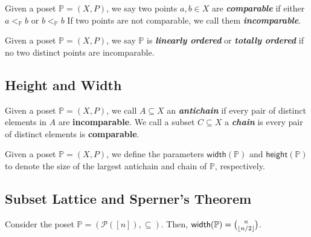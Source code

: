 \begin{definition}[Comparability]
    Given a poset $\mathbb{P} = (X,P)$, we say two points $a,b \in X$ are \textit{\textbf{comparable}} if either $a <_{\mathbb{P}} b$ or $b <_{\mathbb{P}} b$ If two points are not comparable, we call them \textit{\textbf{incomparable}}.
\end{definition}

\begin{definition}
    Given a poset $\mathbb{P} = (X,P)$, we say $\mathbb{P}$ is \textit{\textbf{linearly ordered}} or \textit{\textbf{totally ordered}} if no two distinct points are incomparable.
\end{definition}

\subsection{Height and Width}

\begin{definition}
    Given a poset $\mathbb{P} = (X,P)$, we call $A \subseteq X$ an \textit{\textbf{antichain}} if every pair of distinct elements in $A$ are \textbf{incomparable}. We call a subset $C \subseteq X$ a \textit{\textbf{chain}} is every pair of distinct elements is \textbf{comparable}.
\end{definition}

\begin{definition}
    Given a poset $\mathbb{P} = (X,P)$, we define the parameters $\mathsf{width}(\mathbb{P})$ and $\mathsf{height}(\mathbb{P})$ to denote the size of the largest antichain and chain of $\mathbb{P}$, respectively.
\end{definition}

\subsection{Subset Lattice and Sperner's Theorem}

\begin{theorem}
    Consider the poset $\mathbb{P} = (\mathcal{P}([n]), \subseteq)$. Then, $\mathsf{width}(\mathbb{P}) = \binom{n}{\lfloor n/2\rfloor}$.
\end{theorem}

